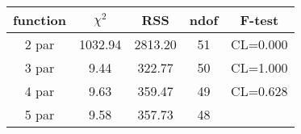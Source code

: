 \begin{tabular}{c|c|c|c|c}
function & $\chi^2$ & RSS & ndof & F-test \\
\hline
2 par & 1032.94 & 2813.20 & 51 & CL=0.000 \\
3 par & 9.44 & 322.77 & 50 & CL=1.000 \\
4 par & 9.63 & 359.47 & 49 & CL=0.628 \\
5 par & 9.58 & 357.73 & 48 & \\
\hline
\end{tabular}